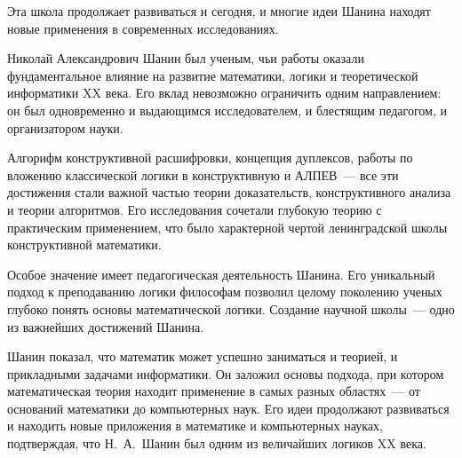 \documentclass[essay,paper]{pmk-graduate}
\begin{document}
Эта школа продолжает развиваться и сегодня, и многие идеи Шанина находят новые применения в современных исследованиях.

\conclusion

Николай Александрович Шанин был ученым, чьи работы оказали фундаментальное влияние на развитие математики, логики и теоретической информатики XX века. Его вклад невозможно ограничить одним направлением: он был одновременно и выдающимся исследователем, и блестящим педагогом, и организатором науки.

Алгорифм конструктивной расшифровки, концепция дуплексов, работы по вложению классической логики в конструктивную и АЛПЕВ~--- все эти достижения стали важной частью теории доказательств, конструктивного анализа и теории алгоритмов. Его исследования сочетали глубокую теорию с практическим применением, что было характерной чертой ленинградской школы конструктивной математики.

Особое значение имеет педагогическая деятельность Шанина. Его уникальный подход к преподаванию логики философам позволил целому поколению ученых глубоко понять основы математической логики. Создание научной школы~--- одно из важнейших достижений Шанина.

Шанин показал, что математик может успешно заниматься и теорией, и прикладными задачами информатики. Он заложил основы подхода, при котором математическая теория находит применение в самых разных областях~--- от оснований математики до компьютерных наук. Его идеи продолжают развиваться и находить новые приложения в математике и компьютерных науках, подтверждая, что Н.~А.~Шанин был одним из величайших логиков XX века.

\newpage
\printfullbibliography
\end{document}
